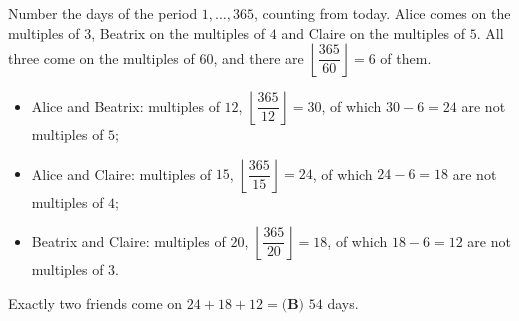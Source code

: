 Number the days of the period $1,\dots,365$, counting from today. Alice comes on the multiples of $3$, Beatrix on the multiples of $4$ and Claire on the multiples of $5$. All three come on the multiples of $60$, and there are $\left\lfloor\dfrac{365}{60}\right\rfloor=6$ of them.
\begin{itemize}
\item Alice and Beatrix: multiples of $12$, $\left\lfloor\dfrac{365}{12}\right\rfloor=30$, of which $30-6=24$ are not multiples of $5$;
\item Alice and Claire: multiples of $15$, $\left\lfloor\dfrac{365}{15}\right\rfloor=24$, of which $24-6=18$ are not multiples of $4$;
\item Beatrix and Claire: multiples of $20$, $\left\lfloor\dfrac{365}{20}\right\rfloor=18$, of which $18-6=12$ are not multiples of $3$.
\end{itemize}
Exactly two friends come on $24+18+12=\boxed{\textbf{(B) }54}$ days.
